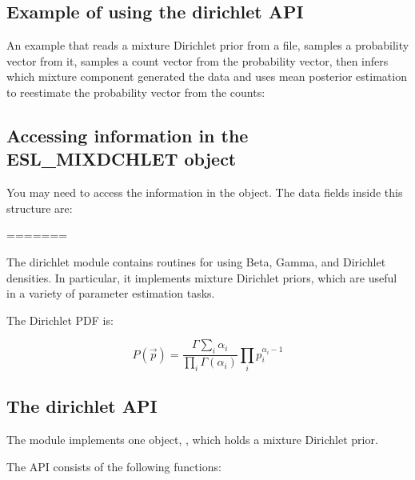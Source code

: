 \subsection{Example of using the dirichlet API}

An example that reads a mixture Dirichlet prior from a file, samples a
probability vector from it, samples a count vector from the
probability vector, then infers which mixture component generated the
data and uses mean posterior estimation to reestimate the probability
vector from the counts:



\subsection{Accessing information in the ESL\_MIXDCHLET object}

You may need to access the information in the 
object. The data fields inside this structure are:






=======

The dirichlet module contains routines for using Beta, Gamma, and
Dirichlet densities. In particular, it implements mixture Dirichlet
priors, which are useful in a variety of parameter estimation tasks.

The Dirichlet PDF is:

\begin{equation}
 P(\vec{p}) = \frac{\Gamma{\sum_i \alpha_i}}{\prod_i \Gamma(\alpha_i)} \prod_i p_i^{\alpha_i-1}
\end{equation}


\subsection{The dirichlet API}

The module implements one object, , which holds
a mixture Dirichlet prior. 

The API consists of the following functions:

